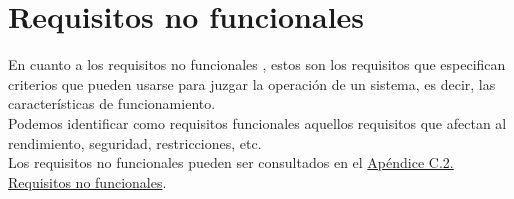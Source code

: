 \section{Requisitos no funcionales}

En cuanto a los requisitos no funcionales \cite{requisitos}, estos son los requisitos que especifican criterios que pueden usarse para juzgar la operación de un sistema, es decir, las características de funcionamiento.
\\

Podemos identificar como requisitos funcionales aquellos requisitos que afectan al rendimiento, seguridad, restricciones, etc.
\\

Los requisitos no funcionales pueden ser consultados en el \hyperref[APRequisitosNoFuncionales]{Apéndice C.2. Requisitos no funcionales}.